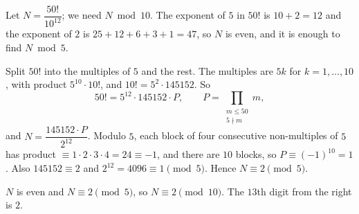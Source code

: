 Let $N=\dfrac{50!}{10^{12}}$; we need $N\bmod10$. The exponent of $5$ in $50!$ is $10+2=12$ and the exponent of $2$ is $25+12+6+3+1=47$, so $N$ is even, and it is enough to find $N\bmod5$.

Split $50!$ into the multiples of $5$ and the rest. The multiples are $5k$ for $k=1,\dots,10$, with product $5^{10}\cdot10!$, and $10!=5^2\cdot145152$. So
\[
50!=5^{12}\cdot145152\cdot P,\qquad P=\prod_{\substack{m\le50\\5\nmid m}}m,
\]
and $N=\dfrac{145152\cdot P}{2^{12}}$. Modulo $5$, each block of four consecutive non-multiples of $5$ has product $\equiv1\cdot2\cdot3\cdot4=24\equiv-1$, and there are $10$ blocks, so $P\equiv(-1)^{10}=1$. Also $145152\equiv2$ and $2^{12}=4096\equiv1\pmod5$. Hence $N\equiv2\pmod5$.

$N$ is even and $N\equiv2\pmod5$, so $N\equiv2\pmod{10}$. The $13$th digit from the right is $\boxed{2}$.

